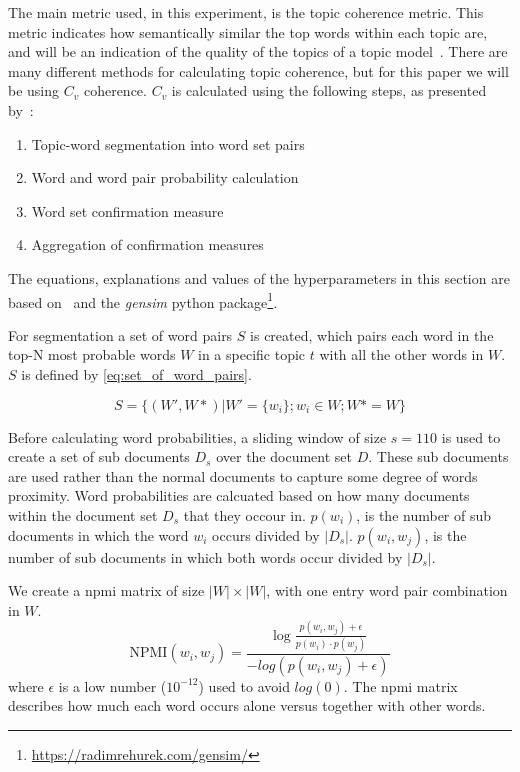 The main metric used, in this experiment, is the topic coherence metric.
This metric indicates how semantically similar the top words within each topic are, and will be an indication of the quality of the topics of a topic model~\cite{topic_coherence_2015}.
There are many different methods for calculating topic coherence, but for this paper we will be using $C_v$ coherence.
$C_v$ is calculated using the following steps, as presented by~\citet{Syed2017coherence}:
\begin{enumerate}
	\item Topic-word segmentation into word set pairs
	\item Word and word pair probability calculation
	\item Word set confirmation measure
	\item Aggregation of confirmation measures
\end{enumerate}

The equations, explanations and values of the hyperparameters in this section are based on~\citet{Syed2017coherence} and the \textit{gensim} python package\footnote{\url{https://radimrehurek.com/gensim/}}.

For segmentation a set of word pairs $S$ is created, which pairs each word in the top-N most probable words $W$ in a specific topic $t$ with all the other words in $W$.
$S$ is defined by \autoref{eq:set_of_word_pairs}.

\begin{equation}\label{eq:set_of_word_pairs}
	S = \{(W', W*)|W' = \{w_i\};w_i \in W;W* = W\}
\end{equation}

Before calculating word probabilities, a sliding window of size $s = 110$ is used to create a set of sub documents $D_s$ over the document set $D$.
These sub documents are used rather than the normal documents to capture some degree of words proximity.
Word probabilities are calcuated based on how many documents within the document set $D_s$ that they occour in.
$p(w_i)$, is the number of sub documents in which the word $w_i$ occurs divided by $|D_s|$.
$p(w_i, w_j)$, is the number of sub documents in which both words occur divided by $|D_s|$. 

We create a \gls{npmi} matrix of size $|W|\times|W|$, with one entry word pair combination in $W$.
\begin{equation}\label{eq:coherence_2}
	\text{NPMI}(w_i,w_j) =  \frac{\log\frac{p(w_i,w_j) + \epsilon}{p(w_i)\cdot p(w_j)}}{-log(p(w_i,w_j) + \epsilon)}
\end{equation}
\noindent where $\epsilon$ is a low number ($10^{-12}$) used to avoid $log(0)$.
The \gls{npmi} matrix describes how much each word occurs alone versus together with other words.

